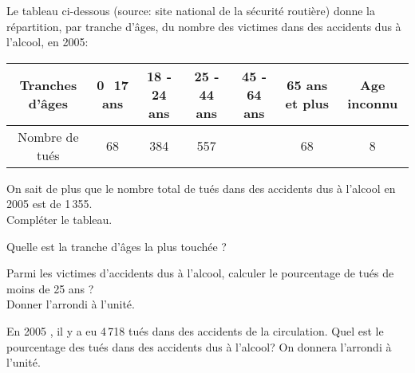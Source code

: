 Le tableau ci-dessous (source: site national de la sécurité routière)
donne la répartition, par tranche d'âges, du nombre des victimes dans
des accidents dus à l'alcool, en 2005:
\begin{center}
  \begin{tabular}{|c|c|c|c|c|c|c|}
    \hline
    Tranches d'âges&0 ­ 17 ans&18 ­ 24 ans&25 ­ 44 ans&45 ­ 64 ans&65
    ans et plus&Age inconnu\\
    \hline
    Nombre de tués&68&384&557&&68&8\\
    \hline
  \end{tabular}
\end{center}
\begin{myenumerate}
  \item On sait de plus que le nombre total de tués dans des accidents
    dus à l'alcool en 2005 est de 1\,355.\\Compléter le tableau.
  \item Quelle est la tranche d'âges la plus touchée ?
  \item Parmi les victimes d'accidents dus à l'alcool, calculer le
    pourcentage de tués de moins de 25 ans ?\\Donner l'arrondi à l'unité.
  \item En 2005 , il y a eu 4\,718 tués dans des accidents de la
    circulation. Quel est le pourcentage des tués dans des accidents
    dus à l'alcool? On donnera l'arrondi à l'unité.
\end{myenumerate}
